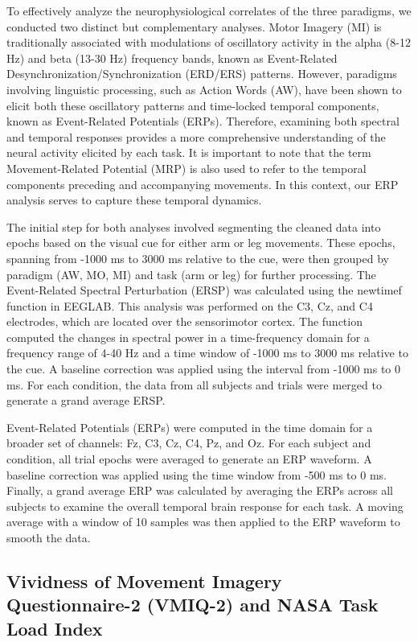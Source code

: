 \documentclass[10pt,letterpaper]{article}
\begin{document}
To effectively analyze the neurophysiological correlates of the three paradigms, we conducted two distinct but complementary analyses. Motor Imagery (MI) is traditionally associated with modulations of oscillatory activity in the alpha (8-12 Hz) and beta (13-30 Hz) frequency bands, known as Event-Related Desynchronization/Synchronization (ERD/ERS) patterns. However, paradigms involving linguistic processing, such as Action Words (AW), have been shown to elicit both these oscillatory patterns and time-locked temporal components, known as Event-Related Potentials (ERPs). Therefore, examining both spectral and temporal responses provides a more comprehensive understanding of the neural activity elicited by each task. It is important to note that the term Movement-Related Potential (MRP) is also used to refer to the temporal components preceding and accompanying movements. In this context, our ERP analysis serves to capture these temporal dynamics.

The initial step for both analyses involved segmenting the cleaned data into epochs based on the visual cue for either arm or leg movements. These epochs, spanning from -1000 ms to 3000 ms relative to the cue, were then grouped by paradigm (AW, MO, MI) and task (arm or leg) for further processing. The Event-Related Spectral Perturbation (ERSP) was calculated using the newtimef function in EEGLAB. This analysis was performed on the C3, Cz, and C4 electrodes, which are located over the sensorimotor cortex. The function computed the changes in spectral power in a time-frequency domain for a frequency range of 4-40 Hz and a time window of -1000 ms to 3000 ms relative to the cue. A baseline correction was applied using the interval from -1000 ms to 0 ms. For each condition, the data from all subjects and trials were merged to generate a grand average ERSP.

Event-Related Potentials (ERPs) were computed in the time domain for a broader set of channels: Fz, C3, Cz, C4, Pz, and Oz. For each subject and condition, all trial epochs were averaged to generate an ERP waveform. A baseline correction was applied using the time window from -500 ms to 0 ms. Finally, a grand average ERP was calculated by averaging the ERPs across all subjects to examine the overall temporal brain response for each task. A moving average with a window of 10 samples was then applied to the ERP waveform to smooth the data.


\subsection{Vividness of Movement Imagery Questionnaire-2 (VMIQ-2) and NASA Task Load Index}
\end{document}
